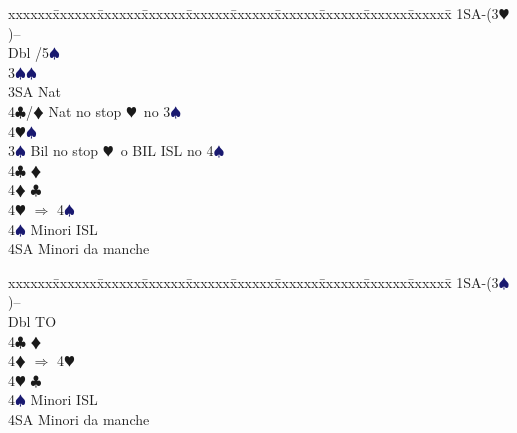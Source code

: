 \documentclass[a4paper,italian]{article}
\newcommand{\BC}{\textcolor{OliveGreen}{$\clubsuit$}}
\newcommand{\BD}{\textcolor{RedOrange}{$\vardiamondsuit$}}
\newcommand{\BH}{\textcolor{Red2}{$\varheartsuit${}}}
\newcommand{\BS}{\textcolor{MidnightBlue}{$\spadesuit${}}}
\newenvironment{bidtable}
{\begin{tabbing}

    xxxxxx\=xxxxxx\=xxxxxx\=xxxxxx\=xxxxxx\=xxxxxx\=xxxxxx\=xxxxxx\=xxxxxx\=xxxxxx\=\kill}
{\end{tabbing} }%
\begin{document}
\begin{multicols}{2}
                                        \begin{bidtable}
                                            1SA-(3\BH)--\+\\
                                            Dbl /5\BS\ \+\\
                                            3\BS{}\BS\ \\
                                            3SA\> Nat\\
                                            4\BC/\BD\> Nat no stop \BH\ no 3\BS\ \\
                                            4\BH{}\BS \-\\
                                            3\BS \> Bil no stop \BH\ o BIL ISL no 4\BS \\
                                            4\BC \> \BD \\
                                            4\BD \> \BC \\
                                            4\BH \> $\Rightarrow$ 4\BS \\
                                            4\BS \> Minori ISL\\
                                            4SA \> Minori da manche\-
                                        \end{bidtable}

                                        \begin{bidtable}
                                            1SA-(3\BS)--\+\\
                                            Dbl \> TO\\
                                            4\BC \> \BD \\
                                            4\BD \> $\Rightarrow$ 4\BH \\
                                            4\BH \> \BC \\
                                            4\BS \> Minori ISL\\
                                            4SA \> Minori da manche\-
                                        \end{bidtable}


                                    \end{multicols}
                                    \newpage
\end{document}
